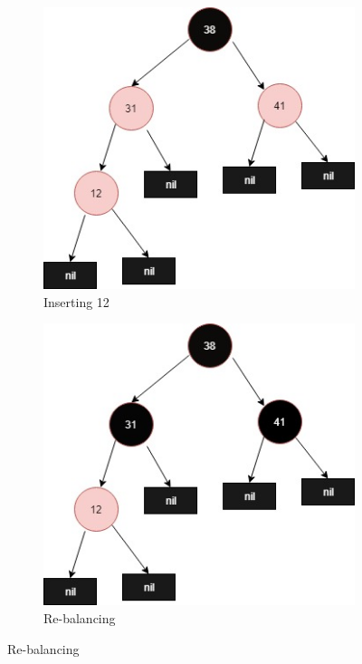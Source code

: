 \documentclass[20pt]{article} %
\begin{document}
\begin{figure}[!htbp]
   	\begin{subfigure}[p]{0.4\linewidth}
    	\includegraphics[width=\linewidth]{4-1.jpg}
     	\caption{Inserting 12}
   	\end{subfigure}
  	\begin{subfigure}[p]{0.4\linewidth}
    	\includegraphics[width=\linewidth]{4-2.jpg}
    	\caption{Re-balancing}
  	\end{subfigure}
\end{figure}
\end{document}
